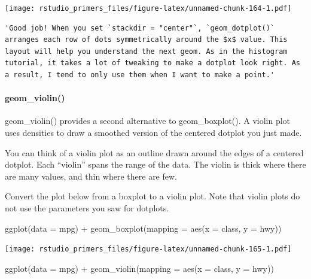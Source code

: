 \documentclass[
]{article}
\newenvironment{Shaded}{\begin{snugshade}}{\end{snugshade}}
\newcommand{\AttributeTok}[1]{\textcolor[rgb]{0.77,0.63,0.00}{#1}}
\newcommand{\FunctionTok}[1]{\textcolor[rgb]{0.00,0.00,0.00}{#1}}
\newcommand{\NormalTok}[1]{#1}
\newcommand{\SpecialCharTok}[1]{\textcolor[rgb]{0.00,0.00,0.00}{#1}}
\begin{document}
\texttt{[image: rstudio\_primers\_files/figure-latex/unnamed-chunk-164-1.pdf]}

\begin{verbatim}
'Good job! When you set `stackdir = "center"`, `geom_dotplot()` arranges each row of dots symmetrically around the $x$ value. This layout will help you understand the next geom. As in the histogram tutorial, it takes a lot of tweaking to make a dotplot look right. As a result, I tend to only use them when I want to make a point.'
\end{verbatim}

\hypertarget{geom_violin}{%
\paragraph{geom\_violin()}\label{geom_violin}}

geom\_violin() provides a second alternative to geom\_boxplot(). A
violin plot uses densities to draw a smoothed version of the centered
dotplot you just made.

You can think of a violin plot as an outline drawn around the edges of a
centered dotplot. Each ``violin'' spans the range of the data. The
violin is thick where there are many values, and thin where there are
few.

Convert the plot below from a boxplot to a violin plot. Note that violin
plots do not use the parameters you saw for dotplots.

\begin{Shaded}
\begin{Highlighting}[]
\FunctionTok{ggplot}\NormalTok{(}\AttributeTok{data =}\NormalTok{ mpg) }\SpecialCharTok{+}
  \FunctionTok{geom\_boxplot}\NormalTok{(}\AttributeTok{mapping =} \FunctionTok{aes}\NormalTok{(}\AttributeTok{x =}\NormalTok{ class, }\AttributeTok{y =}\NormalTok{ hwy))}
\end{Highlighting}
\end{Shaded}

\texttt{[image: rstudio\_primers\_files/figure-latex/unnamed-chunk-165-1.pdf]}

\begin{Shaded}
\begin{Highlighting}[]
\FunctionTok{ggplot}\NormalTok{(}\AttributeTok{data =}\NormalTok{ mpg) }\SpecialCharTok{+}
  \FunctionTok{geom\_violin}\NormalTok{(}\AttributeTok{mapping =} \FunctionTok{aes}\NormalTok{(}\AttributeTok{x =}\NormalTok{ class, }\AttributeTok{y =}\NormalTok{ hwy))}
\end{Highlighting}
\end{Shaded}
\end{document}
